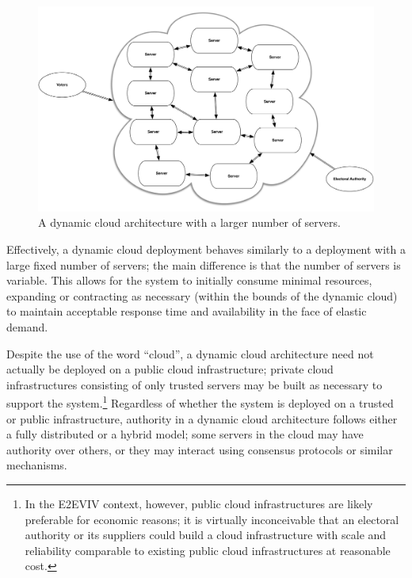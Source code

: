 \begin{figure}
\begin{center}
\includegraphics[width=6.5in]{architecture_resources/dynamic-cloud-large.pdf}
\end{center}
\caption{A dynamic cloud architecture with a larger number of servers.}
\label{figure:arch-dynamic-cloud-large}
\end{figure}

Effectively, a dynamic cloud deployment behaves similarly to a
deployment with a large fixed number of servers; the main difference
is that the number of servers is variable. This allows for the system
to initially consume minimal resources, expanding or contracting as
necessary (within the bounds of the dynamic cloud) to maintain
acceptable response time and availability in the face of elastic
demand.

Despite the use of the word ``cloud'', a dynamic cloud architecture
need not actually be deployed on a public cloud infrastructure;
private cloud infrastructures consisting of only trusted servers may
be built as necessary to support the system.\footnote{In the E2EVIV
  context, however, public cloud infrastructures are likely preferable
  for economic reasons; it is virtually inconceivable that an
  electoral authority or its suppliers could build a cloud
  infrastructure with scale and reliability comparable to existing
  public cloud infrastructures at reasonable cost.}  Regardless of
whether the system is deployed on a trusted or public infrastructure,
authority in a dynamic cloud architecture follows either a fully
distributed or a hybrid model; some servers in the cloud may have
authority over others, or they may interact using consensus protocols
or similar mechanisms.

